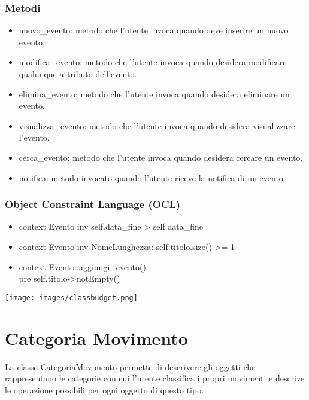 \documentclass[a4paper,12pt]{article}
\begin{document}
\subsubsection*{Metodi}
\begin{itemize} \setlength\itemsep{0.01em}
\item {\ttfamily nuovo\_evento}: metodo che l'utente invoca quando deve inserire un nuovo evento.
\item {\ttfamily modifica\_evento}: metodo che l'utente invoca quando desidera modificare qualunque attributo dell'evento.
\item {\ttfamily elimina\_evento}: metodo che l'utente invoca quando desidera eliminare un evento. 
\item {\ttfamily visualizza\_evento}: metodo che l'utente invoca quando desidera visualizzare l'evento.
\item {\ttfamily cerca\_evento}: metodo che l'utente invoca quando desidera cercare un evento.
\item {\ttfamily notifica}: metodo invocato quando l'utente riceve la notifica di un evento.
\end{itemize}
\subsubsection*{Object Constraint Language (OCL)}
\begin{itemize}
\item {\ttfamily context Evento inv self.data\_fine > self.data\_fine}
\item {\ttfamily context Evento inv NomeLunghezza: self.titolo.size() >= 1}
\item {\ttfamily context Evento::aggiungi\_evento() \\pre self.titolo->notEmpty()}

\end{itemize}
\newpage
\begin{center}
  \texttt{[image: images/classbudget.png]}
\end{center}
\section{Categoria Movimento}

La classe {\sffamily CategoriaMovimento} permette di descrivere gli oggetti che rappresentano le categorie con cui l'utente classifica i propri movimenti e descrive le operazione possibili per ogni oggetto di questo tipo.
\end{document}
